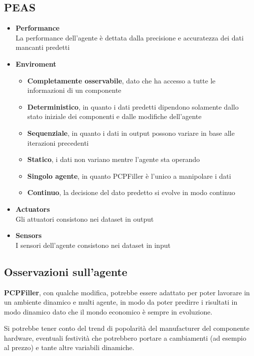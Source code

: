 \documentclass[12pt]{report}
\begin{document}
\subsection{PEAS}

\begin{itemize}
	\item\textbf{Performance}\\
		La performance dell'agente è dettata dalla precisione e accuratezza dei dati mancanti predetti
	\item\textbf{Enviroment}
		\begin{itemize}
			\item \textbf{Completamente osservabile}, dato che ha accesso a tutte le informazioni di un componente
			\item \textbf{Deterministico}, in quanto i dati predetti dipendono solamente dallo stato iniziale dei componenti e dalle modifiche dell'agente
			\item \textbf{Sequenziale}, in quanto i dati in output possono variare in base alle iterazioni precedenti
			\item \textbf{Statico}, i dati non variano mentre l'agente sta operando
			\item \textbf{Singolo agente}, in quanto PCPFiller è l'unico a manipolare i dati
			\item \textbf{Continuo}, la decisione del dato predetto si evolve in modo continuo
		\end{itemize}
	\item\textbf{Actuators}\\
		Gli attuatori consistono nei dataset in output
	\item\textbf{Sensors}\\
		I sensori dell'agente consistono nei dataset in input
\end{itemize}

\subsection{Osservazioni sull'agente}

\textbf{PCPFiller}, con qualche modifica, potrebbe essere adattato per poter lavorare in un ambiente
dinamico e multi agente, in modo da poter predirre i risultati in modo dinamico dato che il mondo
economico è sempre in evoluzione.

Si potrebbe tener conto del trend di popolarità del manufacturer del componente
hardware, eventuali festività che potrebbero portare a cambiamenti (ad esempio al prezzo) e tante
altre variabili dinamiche.
\end{document}
